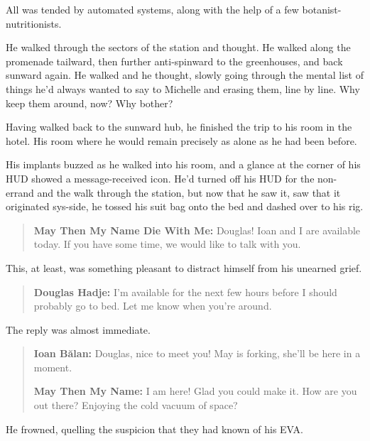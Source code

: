 All was tended by automated systems, along with the help of a few botanist-nutritionists.

He walked through the sectors of the station and thought. He walked along the promenade tailward, then further anti-spinward to the greenhouses, and back sunward again. He walked and he thought, slowly going through the mental list of things he'd always wanted to say to Michelle and erasing them, line by line. Why keep them around, now? Why bother?

Having walked back to the sunward hub, he finished the trip to his room in the hotel. His room where he would remain precisely as alone as he had been before.

His implants buzzed as he walked into his room, and a glance at the corner of his HUD showed a message-received icon. He'd turned off his HUD for the non-errand and the walk through the station, but now that he saw it, saw that it originated sys-side, he tossed his suit bag onto the bed and dashed over to his rig.

\begin{quote}
\textbf{May Then My Name Die With Me:} Douglas! Ioan and I are available today. If you have some time, we would like to talk with you.
\end{quote}

\noindent This, at least, was something pleasant to distract himself from his unearned grief.

\begin{quote}
\textbf{Douglas Hadje:} I'm available for the next few hours before I should probably go to bed. Let me know when you're around.
\end{quote}

\noindent The reply was almost immediate.

\begin{quote}
\textbf{Ioan Bălan:} Douglas, nice to meet you! May is forking, she'll be here in a moment.

\textbf{May Then My Name:} I am here! Glad you could make it. How are you out there? Enjoying the cold vacuum of space?
\end{quote}

\noindent He frowned, quelling the suspicion that they had known of his EVA.

